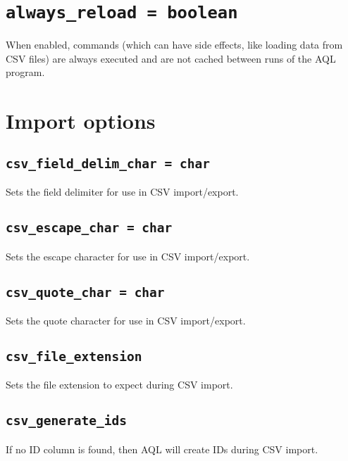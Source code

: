 \documentclass[10pt]{book}
\begin{document}
\section{{\tt always\_reload = boolean}}
When enabled, commands (which can have side effects, like loading data from CSV files) are always executed and are not cached between runs of the AQL program.

\section{Import options}
%

\subsection{{\tt csv\_field\_delim\_char = char}}
Sets the field delimiter for use in CSV import/export.

\subsection{{\tt csv\_escape\_char = char}}
Sets the escape character for use in CSV import/export.

\subsection{{\tt csv\_quote\_char = char}}
Sets the quote character for use in CSV import/export.

\subsection{{\tt csv\_file\_extension}}
Sets the file extension to expect during CSV import.

\subsection{{\tt csv\_generate\_ids}}
If no ID column is found, then AQL will create IDs during CSV import.
\end{document}
